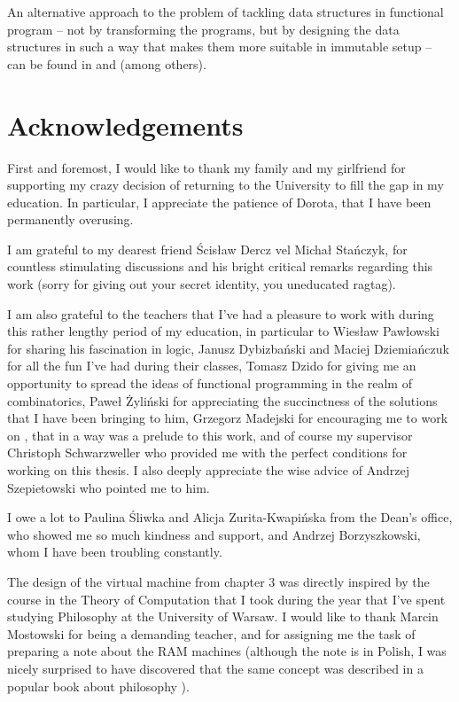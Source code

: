 An alternative approach to the problem of tackling data structures
in functional program -- not by transforming the programs, but
by designing the data structures in such a way that makes them
more suitable in immutable setup -- can be found in \cite{Okasaki1996}
and \cite{Bagwell2002} (among others).

\section{Acknowledgements}

First and foremost, I would like to thank my family and my girlfriend
for supporting my crazy decision of returning to the University to
fill the gap in my education. In particular, I appreciate the patience
of Dorota, that I have been permanently overusing.

I am grateful to my dearest friend Ścisław Dercz vel Michał Stańczyk,
for countless stimulating discussions and his bright critical remarks
regarding this work (sorry for giving out your secret identity, you
uneducated ragtag). 

I am also grateful to the teachers that I've had a pleasure to work
with during this rather lengthy period of my education, in particular
to Wiesław Pawłowski for sharing his fascination in logic, Janusz
Dybizbański and Maciej Dziemiańczuk for all the fun I've had during
their classes, Tomasz Dzido for giving me an opportunity to spread
the ideas of functional programming in the realm of combinatorics,
Paweł Żyliński for appreciating the succinctness of the solutions
that I have been bringing to him, Grzegorz Madejski for encouraging
me to work on \cite{Godek2016}, that in a way was a prelude to this
work, and of course my supervisor Christoph Schwarzweller who provided
me with the perfect conditions for working on this thesis. I also
deeply appreciate the wise advice of Andrzej Szepietowski who
pointed me to him.

I owe a lot to Paulina Śliwka and Alicja Zurita-Kwapińska from
the Dean's office, who showed me so much kindness and support, and
Andrzej Borzyszkowski, whom I have been troubling constantly.

The design of the virtual machine from chapter 3 was directly
inspired by the course in the Theory of Computation that I took
during the year that I've spent studying Philosophy at the University
of Warsaw. I would like to thank Marcin Mostowski for being a demanding
teacher, and for assigning me the task of preparing a note about the
RAM machines \cite{Godek2012} (although the note is in Polish,
I was nicely surprised to have discovered that the same concept
was described in a popular book about philosophy \cite{Dennett2013}).

